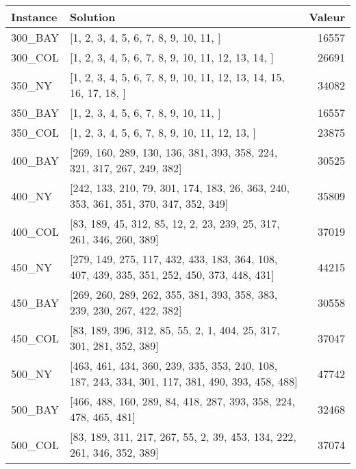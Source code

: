 \documentclass[main.tex]{subfiles}
\begin{document}
\newpage
\begin{center}
\renewcommand{\arraystretch}{1.4} 
\begin{tabular}{llr}\hline
\textbf{Instance} & \textbf{Solution} & \textbf{Valeur} \\\hline

300\_BAY & [1, 2, 3, 4, 5, 6, 7, 8, 9, 10, 11, ] & 16557\\
300\_COL & [1, 2, 3, 4, 5, 6, 7, 8, 9, 10, 11, 12, 13, 14, ] & 26691\\
350\_NY & [1, 2, 3, 4, 5, 6, 7, 8, 9, 10, 11, 12, 13, 14, 15, 16, 17, 18, ] & 34082\\
350\_BAY & [1, 2, 3, 4, 5, 6, 7, 8, 9, 10, 11, ] & 16557\\
350\_COL & [1, 2, 3, 4, 5, 6, 7, 8, 9, 10, 11, 12, 13, ] & 23875\\
400\_BAY & [269, 160, 289, 130, 136, 381, 393, 358, 224, 321, 317, 267, 249, 382] & 30525\\
400\_NY & [242, 133, 210, 79, 301, 174, 183, 26, 363, 240, 353, 361, 351, 370, 347, 352, 349] & 35809\\
400\_COL & [83, 189, 45, 312, 85, 12, 2, 23, 239, 25, 317, 261, 346, 260, 389] & 37019\\
450\_NY & [279, 149, 275, 117, 432, 433, 183, 364, 108, 407, 439, 335, 351, 252, 450, 373, 448, 431] & 44215\\
450\_BAY & [269, 260, 289, 262, 355, 381, 393, 358, 383, 239, 230, 267, 422, 382] & 30558\\
450\_COL & [83, 189, 396, 312, 85, 55, 2, 1, 404, 25, 317, 301, 281, 352, 389] & 37047\\
500\_NY & [463, 461, 434, 360, 239, 335, 353, 240, 108, 187, 243, 334, 301, 117, 381, 490, 393, 458, 488] & 47742\\
500\_BAY & [466, 488, 160, 289, 84, 418, 287, 393, 358, 224, 478, 465, 481] & 32468\\
500\_COL & [83, 189, 311, 217, 267, 55, 2, 39, 453, 134, 222, 261, 346, 352, 389] & 37074\\
\hline\end{tabular}
\end{center}
\end{document}
